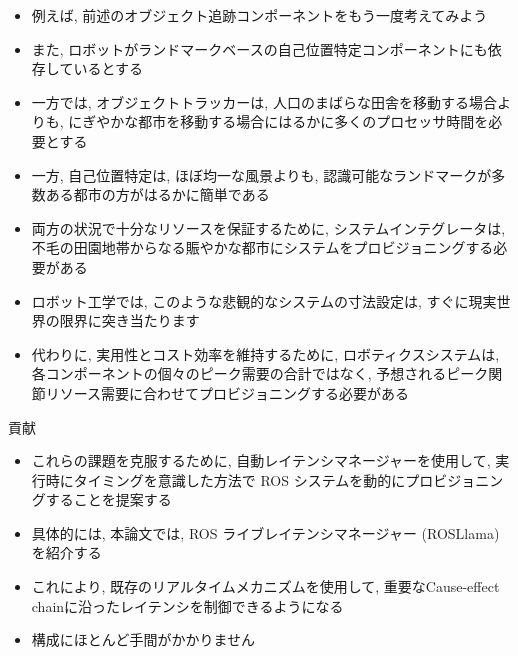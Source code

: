 \begin{frame}{}
    \begin{itemize}
        \item 例えば, 前述のオブジェクト追跡コンポーネントをもう一度考えてみよう
        \item また, ロボットがランドマークベースの自己位置特定コンポーネントにも依存しているとする
        \item 一方では, オブジェクトトラッカーは, 人口のまばらな田舎を移動する場合よりも, にぎやかな都市を移動する場合にはるかに多くのプロセッサ時間を必要とする
        \item 一方, 自己位置特定は, ほぼ均一な風景よりも, 認識可能なランドマークが多数ある都市の方がはるかに簡単である
        \item 両方の状況で十分なリソースを保証するために, システムインテグレータは, 不毛の田園地帯からなる賑やかな都市にシステムをプロビジョニングする必要がある
    \end{itemize}
\end{frame}

\begin{frame}{}
    \begin{itemize}
        \item ロボット工学では, このような悲観的なシステムの寸法設定は, すぐに現実世界の限界に突き当たります
        \item 代わりに, 実用性とコスト効率を維持するために, ロボティクスシステムは, 各コンポーネントの個々のピーク需要の合計ではなく, 予想されるピーク関節リソース需要に合わせてプロビジョニングする必要がある
    \end{itemize}
\end{frame}

\begin{frame}{貢献}
    \begin{itemize}
        \item これらの課題を克服するために, 自動レイテンシマネージャーを使用して, 実行時にタイミングを意識した方法で ROS システムを動的にプロビジョニングすることを提案する
        \item 具体的には, 本論文では, ROS ライブレイテンシマネージャー (ROSLlama) を紹介する
        \item これにより, 既存のリアルタイムメカニズムを使用して, 重要なCause-effect chainに沿ったレイテンシを制御できるようになる
        \item 構成にほとんど手間がかかりません
    \end{itemize}
\end{frame}

